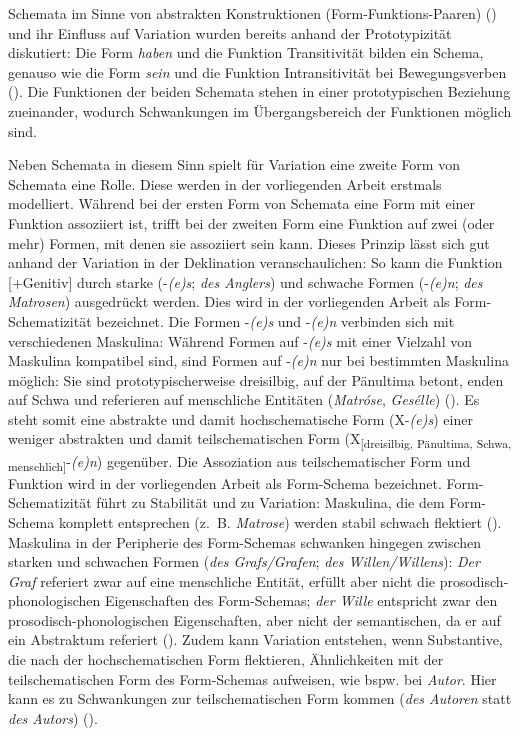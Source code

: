 Schemata im Sinne von abstrakten Konstruktionen (Form-Funktions-Paaren) (\cite[80]{Bybee.2010}) und ihr Einfluss auf Variation wurden bereits anhand der Prototypizität diskutiert: Die Form \textit{haben} und die Funktion Transitivität bilden ein Schema, genauso wie die Form \textit{sein} und die Funktion Intransitivität bei Bewegungsverben (\cite[316--319]{Gillmann.2016}). Die Funktionen der beiden Schemata stehen in einer prototypischen Beziehung zueinander, wodurch Schwankungen im Übergangsbereich der Funktionen möglich sind.

Neben Schemata in diesem Sinn spielt für Variation eine zweite Form von Schemata eine Rolle. Diese werden in der vorliegenden Arbeit erstmals modelliert. Während bei der ersten Form von Schemata eine Form mit einer Funktion assoziiert ist, trifft bei der zweiten Form eine Funktion auf zwei (oder mehr) Formen, mit denen sie assoziiert sein kann. Dieses Prinzip lässt sich gut anhand der Variation in der Deklination veranschaulichen: So kann die Funktion [+Genitiv] durch starke (-\textit{(e)s}; \textit{des Anglers}) und schwache Formen (-\textit{(e)n}; \textit{des Matrosen}) ausgedrückt werden. Dies wird in der vorliegenden Arbeit als Form-Schematizität bezeichnet. Die Formen -\textit{(e)s} und -\textit{(e)n} verbinden sich mit verschiedenen Maskulina: Während Formen auf -\textit{(e)s} mit einer Vielzahl von Maskulina kompatibel sind, sind Formen auf -\textit{(e)n} nur bei bestimmten Maskulina möglich: Sie sind prototypischerweise dreisilbig, auf der Pänultima betont, enden auf Schwa und referieren auf menschliche Entitäten (\textit{Matróse}, \textit{Gesélle}) (\cite[168--170]{Kopcke.1995}). Es steht somit eine abstrakte und damit hochschematische Form (X-\textit{(e)s}) einer weniger abstrakten und damit teilschematischen Form (X\textsubscript{[dreisilbig, Pänultima, Schwa, menschlich]}-\textit{(e)n}) gegenüber. Die Assoziation aus teilschematischer Form und Funktion wird in der vorliegenden Arbeit als Form-Schema bezeichnet. Form-Schematizität führt zu Stabilität und zu Variation: Maskulina, die dem Form-Schema komplett entsprechen (z.~B. \textit{Matrose}) werden stabil schwach flektiert (\cite{Kopcke.2000, Kopcke.2000b}). Maskulina in der Peripherie des Form-Schemas schwanken hingegen zwischen starken und schwachen Formen (\textit{des Grafs/Grafen}; \textit{des Willen/Willens}): \textit{Der Graf} referiert zwar auf eine menschliche Entität, erfüllt aber nicht die prosodisch-pho\-no\-lo\-gi\-schen Eigenschaften des Form-Schemas; \textit{der Wille} entspricht zwar den prosodisch-phonologischen Eigenschaften, aber nicht der semantischen, da er auf ein Abstraktum referiert (\cite[111]{Kopcke.2000}). Zudem kann Variation entstehen, wenn Substantive, die nach der hochschematischen Form flektieren, Ähnlichkeiten mit der teilschematischen Form des Form-Schemas aufweisen, wie bspw. bei \textit{Autor}. Hier kann es zu Schwankungen zur teilschematischen Form kommen (\textit{des Autoren} statt \textit{des Autors}) (\cite[78--79]{Kopcke.2005}).
 
